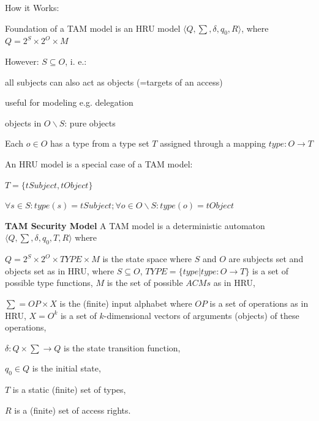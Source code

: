 \documentclass[a4paper]{article}
\renewcommand{\note}[2]{\begin{noteBox} \textbf{#1} #2 \end{noteBox}}
\begin{document}
\begin{multicols}{3}
    How it Works:
    \begin{itemize*}
        \item Foundation of a TAM model is an HRU model $\langle Q,\sum,\delta,q_0 ,R\rangle$, where $Q= 2^S\times 2^O\times M$
        \item However: $S\subseteq O$, i. e.:
        \begin{itemize*}
            \item all subjects can also act as objects (=targets of an access)
            \item useful for modeling e.g. delegation
            \item objects in $O\backslash S$: pure objects
        \end{itemize*}
        \item Each $o\in O$ has a type from a type set $T$ assigned through a mapping $type:O\rightarrow T$
        \item An HRU model is a special case of a TAM model:
        \begin{itemize*}
            \item $T=\{tSubject,tObject\}$
            \item $\forall s\in S:type(s)=tSubject; \forall o\in O\backslash S:type(o)=tObject$
        \end{itemize*}
    \end{itemize*}

    \note{TAM Security Model}{A TAM model is a deterministic automaton $\langle Q,\sum,\delta,q_0 ,T,R\rangle$ where
        \begin{itemize*}
            \item $Q= 2^S\times 2^O\times TYPE\times M$ is the state space where $S$ and $O$ are subjects set and objects set as in HRU, where $S\subseteq O$, $TYPE=\{type|type:O\rightarrow T\}$ is a set of possible type functions, $M$ is the set of possible $ACMs$ as in HRU,
            \item $\sum=OP\times X$ is the (finite) input alphabet where $OP$ is a set of operations as in HRU, $X=O^k$ is a set of $k$-dimensional vectors of arguments (objects) of these operations,
            \item $\delta:Q\times\sum\rightarrow Q$ is the state transition function,
            \item $q_0\in Q$ is the initial state,
            \item $T$ is a static (finite) set of types,
            \item $R$ is a (finite) set of access rights.
        \end{itemize*}
    }


\end{multicols}
\end{document}
